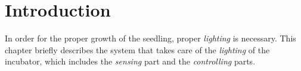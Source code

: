 \documentclass[../../main]{subfiles}
\begin{document}
\section{Introduction} \label{sec:}

In order for the proper growth of the seedling, proper \emph{lighting} is necessary.
This chapter briefly describes the system that takes care of the \emph{lighting} of
the incubator, which includes the \emph{sensing} part and the \emph{controlling} parts.
\end{document}

